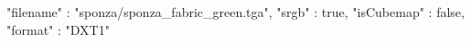 { 
	"filename" : "sponza/sponza_fabric_green.tga", 
	"srgb" : true,
	"isCubemap" : false,
	"format" : "DXT1"
}